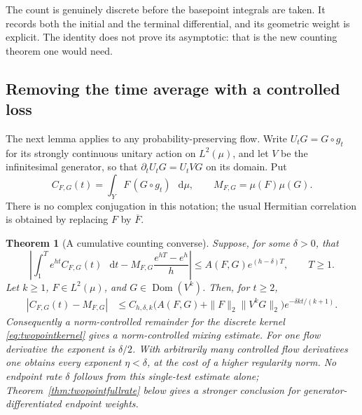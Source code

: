 \documentclass[11pt,a4paper]{article}
\numberwithin{equation}{section}
\newtheorem{theorem}{Theorem}[section]
\theoremstyle{definition}
\theoremstyle{remark}
\newcommand{\dd}{\mathop{}\!\mathrm d}
\begin{document}
The count is genuinely discrete before the basepoint integrals are
taken. It records both the initial and the terminal differential,
and its geometric weight is explicit. The identity does not prove
its asymptotic: that is the new counting theorem one would need.

\subsection{Removing the time average with a controlled loss}
\label{subsec:twopointdeaverage}

The next lemma applies to any probability-preserving flow. Write
$U_tG=G\circ g_t$ for its strongly continuous unitary action on
$L^2(\mu)$, and let $V$ be the infinitesimal generator, so that
$\partial_tU_tG=U_tVG$ on its domain. Put
\[
 C_{F,G}(t)=\int_Y F\,(G\circ g_t)\,\dd\mu,
 \qquad M_{F,G}=\mu(F)\mu(G).
\]
There is no complex conjugation in this notation; the usual
Hermitian correlation is obtained by replacing $F$ by $\overline F$.

\begin{theorem}[A cumulative counting converse]
\label{thm:twopointconverse}
Suppose, for some $\delta>0$, that
\begin{equation}
 \left|\int_1^T e^{ht}C_{F,G}(t)\,\dd t
       -M_{F,G}\frac{e^{hT}-e^h}{h}\right|
 \leq A(F,G)e^{(h-\delta)T},\qquad T\geq1.
 \label{eq:twopointcountassumption}
\end{equation}
Let $k\geq1$, $F\in L^2(\mu)$, and
$G\in\operatorname{Dom}(V^k)$. Then, for $t\geq2$,
\begin{equation}
 \begin{split}
 |C_{F,G}(t)-M_{F,G}|
 &\leq C_{h,\delta,k}
    \bigl(A(F,G)+\|F\|_2\|V^kG\|_2\bigr)
       e^{-\delta k t/(k+1)}.
 \end{split}
 \label{eq:twopointmixrate}
\end{equation}
Consequently a norm-controlled remainder for the discrete kernel
\eqref{eq:twopointkernel} gives a norm-controlled mixing estimate.
For one flow derivative the exponent is $\delta/2$. With arbitrarily
many controlled flow derivatives one obtains every exponent
$\eta<\delta$, at the cost of a higher regularity norm. No endpoint
rate $\delta$ follows from this single-test estimate alone;
Theorem~\ref{thm:twopointfullrate} below gives a stronger conclusion
for generator-differentiated endpoint weights.
\end{theorem}
\end{document}
